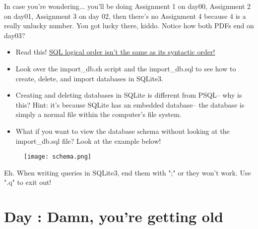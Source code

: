 \documentclass{42-en}
\begin{document}
	In case you're wondering... you'll be doing Assignment 1 on day00, Assignment 2 on day01, Assignment 3 on 
	day 02, then there's no Assignment 4 because 4 is a really unlucky number. You got lucky there, kiddo. 
	Notice how both PDFs end on day03? \\

	\begin{itemize}\itemsep1pt 
			\item	Read this! \href{https://blog.jooq.org/2016/12/09/a-beginners-guide-to-the-true-order-of-sql-operations/}{SQL logical order isn't the same as its syntactic order!}
		\item Look over the import\_db.sh script and the import\_db.sql to see how to create, delete, and import 
			databases in SQLite3.
		\item Creating and deleting databases in SQLite is different from PSQL-- why is this? Hint: 
			it's because SQLite has an embedded database-- the database is simply a normal file within 
			the computer's file system. 
		\item What if you want to view the database schema without looking at the import\_db.sql file? Look at the 
			example below!

	\end{itemize}
 
            \begin{figure}[H]
                \begin{center}
                    \texttt{[image: schema.png]}
                \end{center}
            \end{figure}

	Eh. When writing queries in SQLite3, end them with ";" or they won't work. Use ".q" to exit out! \\ 
	


\nextexercice


\chapter{Day \exercicenumber: Damn, you're getting old }
\makeheaderfiles
\end{document}
